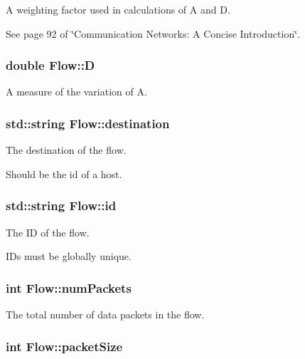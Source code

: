 \-A weighting factor used in calculations of \-A and \-D. 

\-See page 92 of \char`\"{}\-Communication Networks\-: A Concise Introduction\char`\"{}. \hypertarget{classFlow_a6ffa8765220cfbfcf8b358bcbfd8bc4d}{
\subsubsection[{\-D}]{\setlength{\rightskip}{0pt plus 5cm}double {\bf \-Flow\-::\-D}}}\label{classFlow_a6ffa8765220cfbfcf8b358bcbfd8bc4d}


\-A measure of the variation of \-A. 

\hypertarget{classFlow_a536685c38def6cf8b61d0fb0d7e8372d}{
\subsubsection[{destination}]{\setlength{\rightskip}{0pt plus 5cm}std\-::string {\bf \-Flow\-::destination}}}\label{classFlow_a536685c38def6cf8b61d0fb0d7e8372d}


\-The destination of the flow. 

\-Should be the id of a host. \hypertarget{classFlow_a8724a8f4ce94cf7bfb0db79e688ed179}{
\subsubsection[{id}]{\setlength{\rightskip}{0pt plus 5cm}std\-::string {\bf \-Flow\-::id}}}\label{classFlow_a8724a8f4ce94cf7bfb0db79e688ed179}


\-The \-I\-D of the flow. 

\-I\-Ds must be globally unique. \hypertarget{classFlow_a78d725176506b21ce2355b3742ab8c17}{
\subsubsection[{num\-Packets}]{\setlength{\rightskip}{0pt plus 5cm}int {\bf \-Flow\-::num\-Packets}}}\label{classFlow_a78d725176506b21ce2355b3742ab8c17}


\-The total number of data packets in the flow. 

\hypertarget{classFlow_ac5af37a8637ec606977ebc1e33a0c59b}{
\subsubsection[{packet\-Size}]{\setlength{\rightskip}{0pt plus 5cm}int {\bf \-Flow\-::packet\-Size}}}\label{classFlow_ac5af37a8637ec606977ebc1e33a0c59b}


